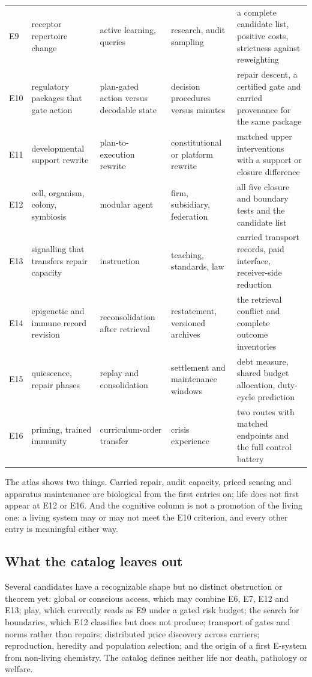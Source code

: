{\begin{longtable}{@{}>{\raggedright\arraybackslash}p{1.0cm}>{\raggedright\arraybackslash}p{3.1cm}>{\raggedright\arraybackslash}p{2.9cm}>{\raggedright\arraybackslash}p{3.1cm}>{\raggedright\arraybackslash}p{4.1cm}@{}}
E9 & receptor repertoire change & active learning, queries & research, audit sampling & a
complete candidate list, positive costs, strictness against reweighting \\
E10 & regulatory packages that gate action & plan-gated action versus decodable state & decision
procedures versus minutes & repair descent, a certified gate and carried provenance for the same
package \\
E11 & developmental support rewrite & plan-to-execution rewrite & constitutional or platform
rewrite & matched upper interventions with a support or closure difference \\
E12 & cell, organism, colony, symbiosis & modular agent & firm, subsidiary, federation & all five
closure and boundary tests and the candidate list \\
E13 & signalling that transfers repair capacity & instruction & teaching, standards, law & carried
transport records, paid interface, receiver-side reduction \\
E14 & epigenetic and immune record revision & reconsolidation after retrieval & restatement,
versioned archives & the retrieval conflict and complete outcome inventories \\
E15 & quiescence, repair phases & replay and consolidation & settlement and maintenance windows &
debt measure, shared budget allocation, duty-cycle prediction \\
E16 & priming, trained immunity & curriculum-order transfer & crisis experience & two routes with
matched endpoints and the full control battery \\
\end{longtable}
}

The atlas shows two things. Carried repair, audit capacity, priced sensing and apparatus
maintenance are biological from the first entries on; life does not first appear at E12 or E16.
And the cognitive column is not a promotion of the living one: a living system may or may not meet
the E10 criterion, and every other entry is meaningful either way.

\subsection{What the catalog leaves out}\label{sec:scope-deferred}

Several candidates have a recognizable shape but no distinct obstruction or theorem yet: global or
conscious access, which may combine E6, E7, E12 and E13; play, which currently reads as E9 under a
gated risk budget; the search for boundaries, which E12 classifies but does not produce; transport of
gates and norms rather than repairs; distributed price discovery across carriers; reproduction,
heredity and population selection; and the origin of a first E-system from non-living chemistry. The
catalog defines neither life nor death, pathology or welfare.

